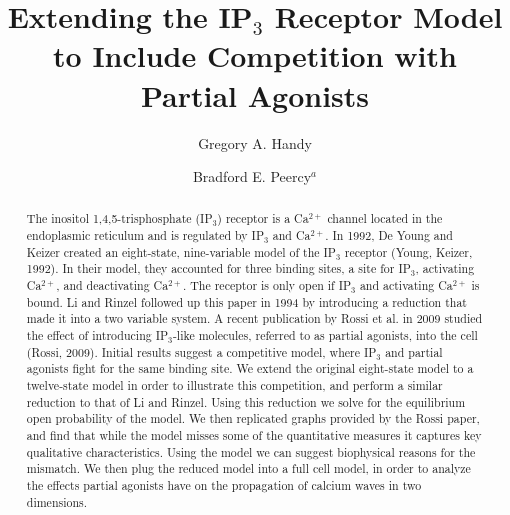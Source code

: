 \documentclass[preprint,12pt]{elsarticle}
\begin{document}
\begin{frontmatter}

\title{Extending the IP$_3$ Receptor Model to Include Competition with Partial Agonists }
\author{Gregory A. Handy} 
\address{handy1@umbc.edu\\ Department of Mathematics and Statistics,\\ University of Maryland Baltimore County}
\author{Bradford E. Peercy$^a$} 
\address{$^a$ corresponding author\\ bpeercy@umbc.edu\quad W:  410-455-2436\\ Fax:  410-455-1066\\ 1000 Hilltop Circle,\\ Department of Mathematics and Statistics,\\ University of Maryland Baltimore County\\ Baltimore, MD 21250}

\begin{abstract}
The inositol 1,4,5-trisphosphate (IP$_3$) receptor is a Ca$^{2+}$ channel located in the endoplasmic reticulum and is regulated by IP$_3$ and Ca$^{2+}$. In 1992, De Young and Keizer created an eight-state, nine-variable model of the IP$_3$ receptor (Young, Keizer, 1992). In their model, they accounted for three binding sites, a site for IP$_3$, activating Ca$^{2+}$, and deactivating Ca$^{2+}$. The receptor is only open if IP$_3$ and activating Ca$^{2+}$ is bound. Li and Rinzel followed up this paper in 1994 by introducing a reduction that made it into a two variable system. A recent publication by Rossi et al. in 2009 studied the effect of introducing IP$_3$-like molecules, referred to as partial agonists, into the cell (Rossi, 2009). Initial results suggest a competitive model, where IP$_3$ and partial agonists fight for the same binding site. We extend the original eight-state model to a twelve-state model in order to illustrate this competition, and perform a similar reduction to that of Li and Rinzel. Using this reduction we solve for the equilibrium open probability of the model. We then replicated graphs provided by the Rossi paper, and find that while the model misses some of the quantitative measures it captures key qualitative characteristics. Using the model we can suggest biophysical reasons for the mismatch. We then plug the reduced model into a full cell model, in order to analyze the effects partial agonists have on the propagation of calcium waves in two dimensions.
\end{abstract}


\end{frontmatter}
\end{document}
